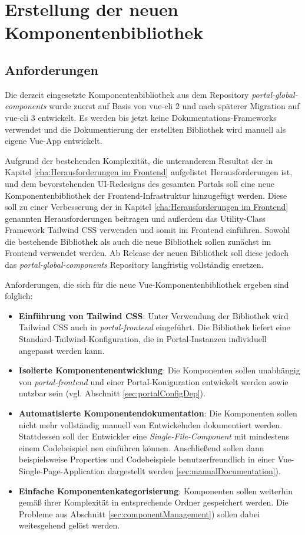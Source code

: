 \chapter{Erstellung der neuen Komponentenbibliothek}
\label{cha:Neue Komponentenbibliothek}

\section{Anforderungen}
Die derzeit eingesetzte Komponentenbibliothek aus dem Repository \textit{portal-global-components} wurde zuerst auf Basis von vue-cli 2 und nach späterer Migration auf vue-cli 3 entwickelt. Es werden bis jetzt keine Dokumentations-Frameworks verwendet und die Dokumentierung der erstellten Bibliothek wird manuell als eigene Vue-App entwickelt.

Aufgrund der bestehenden Komplexität, die unteranderem Resultat der in Kapitel \ref{cha:Herausforderungen im Frontend} aufgelistet Herausforderungen ist, und dem bevorstehenden  UI-Redesigns des gesamten Portals soll eine neue Komponentenbibliothek der Frontend-Infrastruktur hinzugefügt werden. Diese soll zu einer Verbesserung der in Kapitel \ref{cha:Herausforderungen im Frontend} genannten Herausforderungen beitragen und außerdem das Utility-Class Framework Tailwind CSS verwenden und somit im Frontend einführen. Sowohl die bestehende Bibliothek als auch die neue Bibliothek sollen zunächst im Frontend verwendet werden. Ab Release der neuen Bibliothek soll diese jedoch das \textit{portal-global-components} Repository langfristig vollständig ersetzen.

Anforderungen, die sich für die neue Vue-Komponentenbibliothek ergeben sind folglich:
\begin{itemize}
    \item \textbf{Einführung von Tailwind CSS}: Unter Verwendung der Bibliothek wird Tailwind CSS auch in \textit{portal-frontend} eingeführt. Die Bibliothek liefert eine Standard-Tailwind-Konfiguration, die in Portal-Instanzen individuell angepasst werden kann.
    \item \textbf{Isolierte Komponentenentwicklung}: Die Komponenten sollen unabhängig von \textit{portal-frontend} und einer Portal-Koniguration entwickelt werden sowie nutzbar sein (vgl. Abschnitt \ref{sec:portalConfigDep}).
    \item \textbf{Automatisierte Komponentendokumentation}: Die Komponenten sollen nicht mehr vollständig manuell von Entwickelnden dokumentiert werden. Stattdessen soll der Entwickler eine \textit{Single-File-Component} mit mindestens einem Codebeispiel neu einführen können. Anschließend sollen dann beispielsweise Properties und Codebeispiele benutzerfreundlich in einer Vue-Single-Page-Application dargestellt werden \ref{sec:manualDocumentation}).
    \item \textbf{Einfache Komponentenkategorisierung}: Komponenten sollen weiterhin gemäß ihrer Komplexität in entsprechende Ordner gespeichert werden. Die Probleme aus Abschnitt \ref{sec:componentManagement}) sollen dabei weitesgehend gelöst werden.
  \end{itemize}

